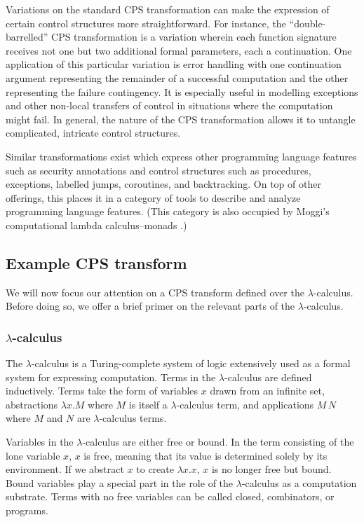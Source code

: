 \documentclass[ms,electronic,twosidetoc,letterpaper,chaptercenter,parttop]{byumsphd}
\begin{document}
Variations on the standard CPS transformation can make the expression of certain control
structures more straightforward. For instance, the ``double-barrelled'' CPS transformation
is a variation wherein each function signature receives not one but two additional formal
parameters, each a continuation. One application of this particular variation is error
handling with one continuation argument representing the remainder of a successful
computation and the other representing the failure contingency. It is especially useful in
modelling exceptions and other non-local transfers of control in situations where the
computation might fail. In general, the nature of the CPS transformation allows it to
untangle complicated, intricate control structures.

Similar transformations exist which express other programming language features such as
security annotations \cite{wallach2000safkasi} and control structures such as procedures,
exceptions, labelled jumps, coroutines, and backtracking. On top of other offerings, this
places it in a category of tools to describe and analyze programming language features.
(This category is also occupied by Moggi's computational lambda calculus--monads
\cite{moggi1989computational}.)

\subsection{Example CPS transform}

We will now focus our attention on a CPS transform defined over the $\lambda$-calculus.
Before doing so, we offer a brief primer on the relevant parts of the $\lambda$-calculus.

\subsubsection{$\lambda$-calculus}

The $\lambda$-calculus is a Turing-complete system of logic extensively used as a formal
system for expressing computation. Terms in the $\lambda$-calculus are defined
inductively. Terms take the form of variables $x$ drawn from an infinite set, abstractions
$\lambda x.M$ where $M$ is itself a $\lambda$-calculus term, and applications $M\,N$ where
$M$ and $N$ are $\lambda$-calculus terms.

Variables in the $\lambda$-calculus are either free or bound. In the term consisting of
the lone variable $x$, $x$ is free, meaning that its value is determined solely by its
environment. If we abstract $x$ to create $\lambda x.x$, $x$ is no longer free but bound.
Bound variables play a special part in the role of the $\lambda$-calculus as a computation
substrate. Terms with no free variables can be called closed, combinators, or programs.
\end{document}
